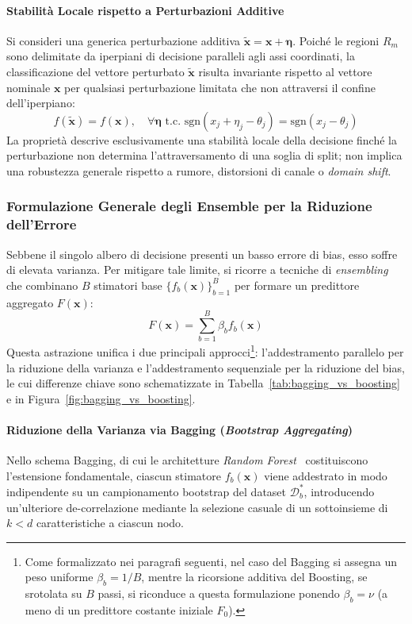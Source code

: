 \paragraph{Stabilità Locale rispetto a Perturbazioni Additive}
Si consideri una generica perturbazione additiva $\tilde{\mathbf{x}} = \mathbf{x} + \boldsymbol{\eta}$. Poiché le regioni $R_m$ sono delimitate da iperpiani di decisione paralleli agli assi coordinati, la classificazione del vettore perturbato $\tilde{\mathbf{x}}$ risulta invariante rispetto al vettore nominale $\mathbf{x}$ per qualsiasi perturbazione limitata che non attraversi il confine dell'iperpiano:
\begin{equation}
    f(\tilde{\mathbf{x}}) = f(\mathbf{x}), \quad \forall \boldsymbol{\eta} \text{ t.c. } \text{sgn}(x_j + \eta_j - \theta_j) = \text{sgn}(x_j - \theta_j)
\end{equation}
La proprietà descrive esclusivamente una stabilità locale della decisione finché la perturbazione non determina l'attraversamento di una soglia di split; non implica una robustezza generale rispetto a rumore, distorsioni di canale o \textit{domain shift}.

\subsubsection{Formulazione Generale degli Ensemble per la Riduzione dell'Errore}
Sebbene il singolo albero di decisione presenti un basso errore di bias, esso soffre di elevata varianza. Per mitigare tale limite, si ricorre a tecniche di \textit{ensembling} che combinano $B$ stimatori base $\{f_b(\mathbf{x})\}_{b=1}^B$ per formare un predittore aggregato $F(\mathbf{x})$:
\begin{equation}
    F(\mathbf{x}) = \sum_{b=1}^B \beta_b f_b(\mathbf{x})
\end{equation}
Questa astrazione unifica i due principali approcci\footnote{Come formalizzato nei paragrafi seguenti, nel caso del Bagging si assegna un peso uniforme $\beta_b = 1/B$, mentre la ricorsione additiva del Boosting, se srotolata su $B$ passi, si riconduce a questa formulazione ponendo $\beta_b = \nu$ (a meno di un predittore costante iniziale $F_0$).}: l'addestramento parallelo per la riduzione della varianza e l'addestramento sequenziale per la riduzione del bias, le cui differenze chiave sono schematizzate in Tabella~\ref{tab:bagging_vs_boosting} e in Figura~\ref{fig:bagging_vs_boosting}.

\paragraph{Riduzione della Varianza via Bagging (\textit{Bootstrap Aggregating})}
Nello schema Bagging, di cui le architetture \textit{Random Forest}~\cite{breiman2001} costituiscono l'estensione fondamentale, ciascun stimatore $f_b(\mathbf{x})$ viene addestrato in modo indipendente su un campionamento bootstrap del dataset $\mathcal{D}_b^*$, introducendo un'ulteriore de-correlazione mediante la selezione casuale di un sottoinsieme di $k < d$ caratteristiche a ciascun nodo.

